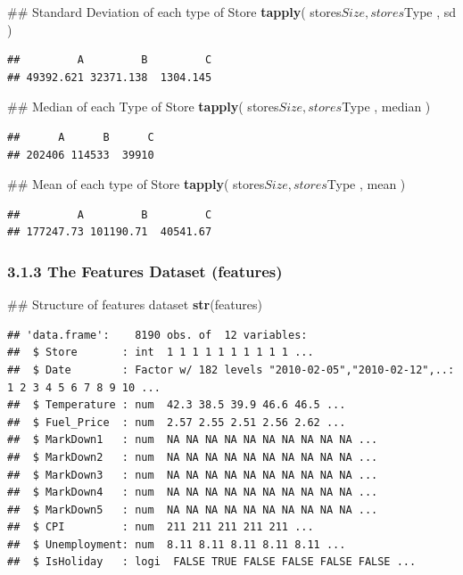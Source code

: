 \documentclass[]{article}
\newenvironment{Shaded}{\begin{snugshade}}{\end{snugshade}}
\newcommand{\KeywordTok}[1]{\textcolor[rgb]{0.13,0.29,0.53}{\textbf{{#1}}}}
\newcommand{\NormalTok}[1]{{#1}}
\begin{document}
\begin{Shaded}
\begin{Highlighting}[]
\NormalTok{## Standard Deviation of each type of Store}
\KeywordTok{tapply}\NormalTok{( stores$Size , stores$Type , sd )}
\end{Highlighting}
\end{Shaded}

\begin{verbatim}
##         A         B         C 
## 49392.621 32371.138  1304.145
\end{verbatim}

\begin{Shaded}
\begin{Highlighting}[]
\NormalTok{## Median of each Type of Store}
\KeywordTok{tapply}\NormalTok{( stores$Size , stores$Type , median )}
\end{Highlighting}
\end{Shaded}

\begin{verbatim}
##      A      B      C 
## 202406 114533  39910
\end{verbatim}

\begin{Shaded}
\begin{Highlighting}[]
\NormalTok{## Mean of each type of Store}
\KeywordTok{tapply}\NormalTok{( stores$Size , stores$Type , mean )}
\end{Highlighting}
\end{Shaded}

\begin{verbatim}
##         A         B         C 
## 177247.73 101190.71  40541.67
\end{verbatim}

\subsubsection{3.1.3 The Features Dataset
(features)}\label{the-features-dataset-features}

\begin{Shaded}
\begin{Highlighting}[]
\NormalTok{## Structure of features dataset}
\KeywordTok{str}\NormalTok{(features)}
\end{Highlighting}
\end{Shaded}

\begin{verbatim}
## 'data.frame':    8190 obs. of  12 variables:
##  $ Store       : int  1 1 1 1 1 1 1 1 1 1 ...
##  $ Date        : Factor w/ 182 levels "2010-02-05","2010-02-12",..: 1 2 3 4 5 6 7 8 9 10 ...
##  $ Temperature : num  42.3 38.5 39.9 46.6 46.5 ...
##  $ Fuel_Price  : num  2.57 2.55 2.51 2.56 2.62 ...
##  $ MarkDown1   : num  NA NA NA NA NA NA NA NA NA NA ...
##  $ MarkDown2   : num  NA NA NA NA NA NA NA NA NA NA ...
##  $ MarkDown3   : num  NA NA NA NA NA NA NA NA NA NA ...
##  $ MarkDown4   : num  NA NA NA NA NA NA NA NA NA NA ...
##  $ MarkDown5   : num  NA NA NA NA NA NA NA NA NA NA ...
##  $ CPI         : num  211 211 211 211 211 ...
##  $ Unemployment: num  8.11 8.11 8.11 8.11 8.11 ...
##  $ IsHoliday   : logi  FALSE TRUE FALSE FALSE FALSE FALSE ...
\end{verbatim}
\end{document}
